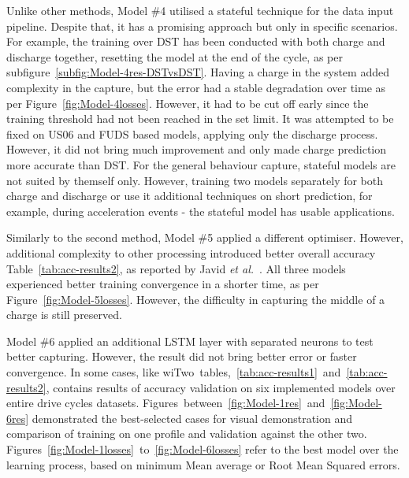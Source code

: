 %
%
Unlike other methods, Model \#4 utilised a stateful technique for the data input pipeline.
Despite that, it has a promising approach but only in specific scenarios.
For example, the training over DST has been conducted with both charge and discharge together, resetting the model at the end of the cycle, as per subfigure~\ref{subfig:Model-4res-DSTvsDST}.
Having a charge in the system added complexity in the capture, but the error had a stable degradation over time as per Figure~\ref{fig:Model-4losses}.
However, it had to be cut off early since the training threshold had not been reached in the set limit.
It was attempted to be fixed on US06 and FUDS based models, applying only the discharge process.
However, it did not bring much improvement and only made charge prediction more accurate than DST.
For the general behaviour capture, stateful models are not suited by themself only.
However, training two models separately for both charge and discharge or use it additional techniques on short prediction, for example, during acceleration events - the stateful model has usable applications.

%
%
Similarly to the second method, Model \#5 applied a different optimiser.
However, additional complexity to other processing introduced better overall accuracy Table~\ref{tab:acc-results2}, as reported by Javid \textit{et al.}~\cite{javid_adaptive_2020}.
All three models experienced better training convergence in a shorter time, as per Figure~\ref{fig:Model-5losses}.
However, the difficulty in capturing the middle of a charge is still preserved.

%
%
Model \#6 applied an additional LSTM layer with separated neurons to test better capturing.
However, the result did not bring better error or faster convergence.
In some cases, like wi\mbox{Two tables, \ref{tab:acc-results1} and \ref{tab:acc-results2}}, contains results of accuracy validation on six implemented models over entire drive cycles datasets.
\mbox{Figures between \ref{fig:Model-1res} and \ref{fig:Model-6res}} demonstrated the best-selected cases for visual demonstration and comparison of training on one profile and validation against the other two.
\mbox{Figures \ref{fig:Model-1losses} to \ref{fig:Model-6losses}} refer to the best model over the learning process, based on minimum Mean average or Root Mean Squared errors.

